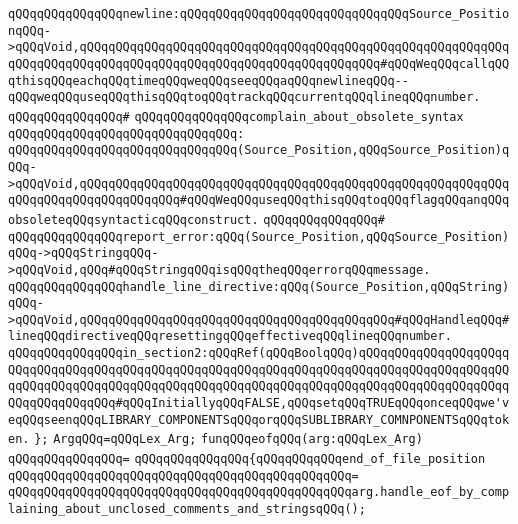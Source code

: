 \newline
\verb|qQQqqQQqqQQqqQQqnewline:qQQqqQQqqQQqqQQqqQQqqQQqqQQqqQQqSource_PositionqQQq->qQQqVoid,qQQqqQQqqQQqqQQqqQQqqQQqqQQqqQQqqQQqqQQqqQQqqQQqqQQqqQQqqQQqqQQqqQQqqQQqqQQqqQQqqQQqqQQqqQQqqQQqqQQqqQQqqQQqqQQq#qQQqWeqQQqcallqQQqthisqQQqeachqQQqtimeqQQqweqQQqseeqQQqaqQQqnewlineqQQq--qQQqweqQQquseqQQqthisqQQqtoqQQqtrackqQQqcurrentqQQqlineqQQqnumber.|\newline
\verb|qQQqqQQqqQQqqQQq#|\newline
\verb|qQQqqQQqqQQqqQQqcomplain_about_obsolete_syntax|\newline
\verb|qQQqqQQqqQQqqQQqqQQqqQQqqQQqqQQq:|\newline
\verb|qQQqqQQqqQQqqQQqqQQqqQQqqQQqqQQq(Source_Position,qQQqSource_Position)qQQq->qQQqVoid,qQQqqQQqqQQqqQQqqQQqqQQqqQQqqQQqqQQqqQQqqQQqqQQqqQQqqQQqqQQqqQQqqQQqqQQqqQQqqQQqqQQq#qQQqWeqQQquseqQQqthisqQQqtoqQQqflagqQQqanqQQqobsoleteqQQqsyntacticqQQqconstruct.|\newline
\verb|qQQqqQQqqQQqqQQq#|\newline
\verb|qQQqqQQqqQQqqQQqreport_error:qQQq(Source_Position,qQQqSource_Position)qQQq->qQQqStringqQQq->qQQqVoid,qQQq#qQQqStringqQQqisqQQqtheqQQqerrorqQQqmessage.|\newline
\verb|qQQqqQQqqQQqqQQqhandle_line_directive:qQQq(Source_Position,qQQqString)qQQq->qQQqVoid,qQQqqQQqqQQqqQQqqQQqqQQqqQQqqQQqqQQqqQQqqQQq#qQQqHandleqQQq#lineqQQqdirectiveqQQqresettingqQQqeffectiveqQQqlineqQQqnumber.|\newline
\verb|qQQqqQQqqQQqqQQqin_section2:qQQqRef(qQQqBoolqQQq)qQQqqQQqqQQqqQQqqQQqqQQqqQQqqQQqqQQqqQQqqQQqqQQqqQQqqQQqqQQqqQQqqQQqqQQqqQQqqQQqqQQqqQQqqQQqqQQqqQQqqQQqqQQqqQQqqQQqqQQqqQQqqQQqqQQqqQQqqQQqqQQqqQQqqQQqqQQqqQQqqQQqqQQqqQQqqQQq#qQQqInitiallyqQQqFALSE,qQQqsetqQQqTRUEqQQqonceqQQqwe'veqQQqseenqQQqLIBRARY_COMPONENTSqQQqorqQQqSUBLIBRARY_COMNPONENTSqQQqtoken.|\newline
\verb|};|\newline
\newline
\verb|ArgqQQq=qQQqLex_Arg;|\newline
\newline
\verb|funqQQqeofqQQq(arg:qQQqLex_Arg)|\newline
\verb|qQQqqQQqqQQqqQQq=|\newline
\verb|qQQqqQQqqQQqqQQq{qQQqqQQqqQQqend_of_file_position|\newline
\verb|qQQqqQQqqQQqqQQqqQQqqQQqqQQqqQQqqQQqqQQqqQQqqQQq=|\newline
\verb|qQQqqQQqqQQqqQQqqQQqqQQqqQQqqQQqqQQqqQQqqQQqqQQqarg.handle_eof_by_complaining_about_unclosed_comments_and_stringsqQQq();|\newline
